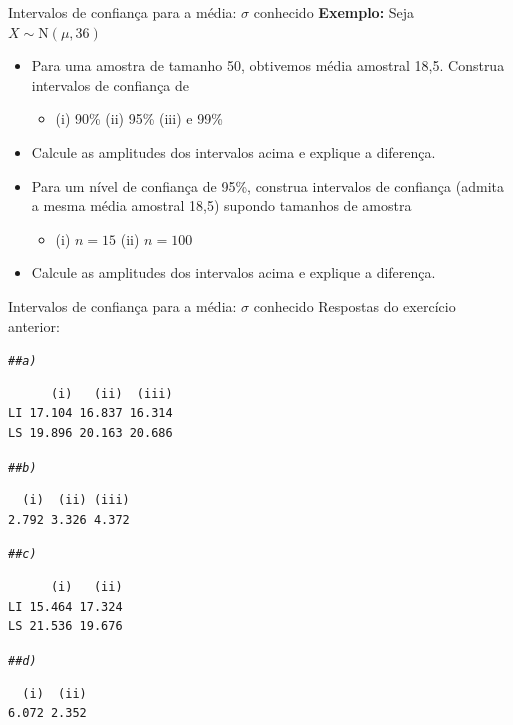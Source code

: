 \documentclass[10pt]{beamer}\usepackage[]{graphicx}\usepackage[]{color}
\makeatletter
\newcommand{\hlcom}[1]{\textcolor[rgb]{0.678,0.584,0.686}{\textit{#1}}}%
\newenvironment{kframe}{%
 \def\at@end@of@kframe{}%
 \ifinner\ifhmode%
  \def\at@end@of@kframe{\end{minipage}}%
  \begin{minipage}{\columnwidth}%
 \fi\fi%
 \def\FrameCommand##1{\hskip\@totalleftmargin \hskip-\fboxsep
 \colorbox{shadecolor}{##1}\hskip-\fboxsep
     \hskip-\linewidth \hskip-\@totalleftmargin \hskip\columnwidth}%
 \MakeFramed {\advance\hsize-\width
   \@totalleftmargin\z@ \linewidth\hsize
   \@setminipage}}%
 {\par\unskip\endMakeFramed%
 \at@end@of@kframe}
\newenvironment{knitrout}{}{} %
\providecommand{\N}{\text{N}}
\theoremstyle{definition}
\makeatother
\begin{document}
\begin{frame}[fragile]{Intervalos de confiança para a média: $\sigma$ conhecido}
  \textbf{Exemplo:} Seja $X \sim \N(\mu, 36)$
  \begin{itemize}
  \item[a)] Para uma amostra de tamanho 50, obtivemos média amostral
    18,5. Construa intervalos de confiança de
    \begin{itemize}
    \item[] (i) 90\% \quad (ii) 95\% \quad (iii) e 99\%
    \end{itemize}
  \item[b)] Calcule as amplitudes dos intervalos acima e explique a
    diferença.
  \item[c)] Para um nível de confiança de 95\%, construa intervalos de
    confiança (admita a mesma média amostral 18,5) supondo tamanhos de
    amostra
    \begin{itemize}
    \item[] (i) $n = 15$ \quad (ii) $n = 100$
    \end{itemize}
  \item[d)] Calcule as amplitudes dos intervalos acima e explique a
    diferença.
  \end{itemize}
\end{frame}

\begin{frame}[fragile]{Intervalos de confiança para a média: $\sigma$ conhecido}
Respostas do exercício anterior:
\begin{knitrout}\footnotesize
{}\color{fgcolor}\begin{kframe}
\begin{alltt}
\hlcom{## a)}
\end{alltt}
\begin{verbatim}
      (i)   (ii)  (iii)
LI 17.104 16.837 16.314
LS 19.896 20.163 20.686
\end{verbatim}
\begin{alltt}
\hlcom{## b)}
\end{alltt}
\begin{verbatim}
  (i)  (ii) (iii) 
2.792 3.326 4.372 
\end{verbatim}
\begin{alltt}
\hlcom{## c)}
\end{alltt}
\begin{verbatim}
      (i)   (ii)
LI 15.464 17.324
LS 21.536 19.676
\end{verbatim}
\begin{alltt}
\hlcom{## d)}
\end{alltt}
\begin{verbatim}
  (i)  (ii) 
6.072 2.352 
\end{verbatim}
\end{kframe}
\end{knitrout}

\end{frame}
\end{document}
